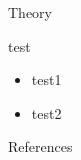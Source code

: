 \documentclass[10pt,utf8x]{beamer}
\begin{document}

\begin{frame}
    \makemytitle
\end{frame}

\begin{frame}{Theory}
  \begin{block}{test}
    \begin{itemize}
      \item test1
      \item test2
    \end{itemize}
  \end{block}
\end{frame}

\begin{frame}[allowframebreaks]{References}
  \vspace{-0.05\textheight}
  \scriptsize
  
  
\end{frame}

\end{document}
